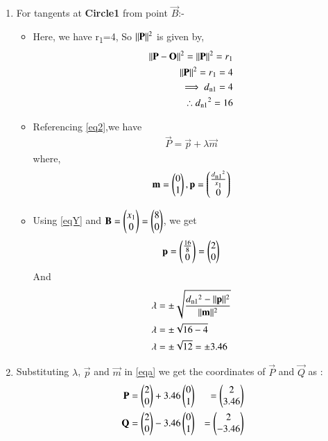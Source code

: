 \documentclass[journal,12pt,twocolumn]{IEEEtran}
\begin{document}
\begin{enumerate}
\begin{proof}
\begin{itemize}
\end{itemize}
\end{proof}
\item For tangents at \textbf{Circle1} from point $\vec{B}$:-
\begin{itemize}
\item Here, we have r\textsubscript{1}=4, So $\lVert\mathbf{P}\rVert^2$ is given by,
\begin{align}
 \lVert\mathbf{P}-\mathbf{O}\rVert^2=\lVert\mathbf{P}\rVert^2=r\textsubscript{1}
 \\
 \lVert\mathbf{P}\rVert^2=r\textsubscript{1}=4
 \\
 \implies d\textsubscript{n1}=4
 \\
  \therefore  d\textsubscript{n1}^2=16 \label{eqY}
\end{align}
\item Referencing \eqref{eq2},we have
\begin{align}
 \vec{P}=\vec{p}+\lambda \vec{m}   \label{eqa}
\end{align}
where,
\begin{align}
 \mathbf{m}=\begin{pmatrix}0\\1\end{pmatrix},\mathbf{p}=\begin{pmatrix}\frac{d\textsubscript{n1}^2}{x\textsubscript{1}}\\0\end{pmatrix}
 \end{align}
 \item Using \eqref{eqY} and $\mathbf{B}=\begin{pmatrix}x\textsubscript{1}\\0\end{pmatrix}=\begin{pmatrix}8\\0\end{pmatrix}$, we get 
 \begin{align}
 \mathbf{p}=\begin{pmatrix}\frac{16}{8}\\0\end{pmatrix}=\begin{pmatrix}2\\0\end{pmatrix}
\end{align}
And
\begin{align}
\lambda &= \pm\sqrt{\frac{d\textsubscript{n1}^2-\lVert\mathbf{p}\rVert^2}{\lVert\mathbf{m}\rVert^2}}
\\
\lambda &= \pm\sqrt{16-4}
\\
\lambda &= \pm\sqrt{12}=\pm 3.46
\end{align}
\end{itemize}
\item Substituting $\lambda$, $\vec{p}$ and $\vec{m}$ in \eqref{eqa} we get the coordinates of $\vec{P}$ and  $\vec{Q}$ as :
\begin{align}
\vec{P}&=\myvec{2\\0}+ 3.46\myvec{0\\1}&=\myvec{2\\3.46}
\\
\vec{Q}&=\myvec{2\\0}- 3.46\myvec{0\\1}&=\myvec{2\\-3.46}

\end{align}
\end{enumerate}
\end{document}
